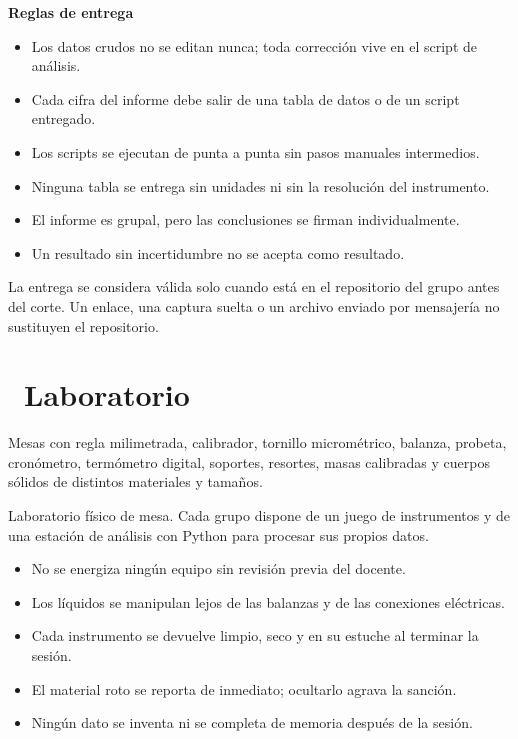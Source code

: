 \documentclass[11pt,a4paper]{article}
\newcommand{\iconotexto}[2]{\textcolor{cyanNeon}{\faIcon{#1}}~#2}
\begin{document}
\textbf{Reglas de entrega}

\begin{itemize}[leftmargin=1.4em,itemsep=2pt,topsep=3pt]
  \item Los datos crudos no se editan nunca; toda corrección vive en el script de análisis.
  \item Cada cifra del informe debe salir de una tabla de datos o de un script entregado.
  \item Los scripts se ejecutan de punta a punta sin pasos manuales intermedios.
  \item Ninguna tabla se entrega sin unidades ni sin la resolución del instrumento.
  \item El informe es grupal, pero las conclusiones se firman individualmente.
  \item Un resultado sin incertidumbre no se acepta como resultado.
\end{itemize}

\begin{cajaRecuerda}La entrega se considera válida solo cuando está en el repositorio del grupo antes del corte. Un enlace, una captura suelta o un archivo enviado por mensajería no sustituyen el repositorio.\end{cajaRecuerda}

\section{\iconotexto{server}{Laboratorio}}

Mesas con regla milimetrada, calibrador, tornillo micrométrico, balanza, probeta, cronómetro, termómetro digital, soportes, resortes, masas calibradas y cuerpos sólidos de distintos materiales y tamaños.

Laboratorio físico de mesa. Cada grupo dispone de un juego de instrumentos y de una estación de análisis con Python para procesar sus propios datos.

\begin{itemize}[leftmargin=1.4em,itemsep=2pt,topsep=3pt]
  \item No se energiza ningún equipo sin revisión previa del docente.
  \item Los líquidos se manipulan lejos de las balanzas y de las conexiones eléctricas.
  \item Cada instrumento se devuelve limpio, seco y en su estuche al terminar la sesión.
  \item El material roto se reporta de inmediato; ocultarlo agrava la sanción.
  \item Ningún dato se inventa ni se completa de memoria después de la sesión.
\end{itemize}
\end{document}
